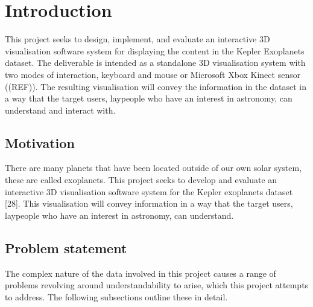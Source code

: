 \chapter{Introduction}\label{C:intro}
This project seeks to design, implement, and evaluate an interactive 3D visualisation software system for displaying the content in the Kepler Exoplanets dataset. The deliverable is intended as a standalone 3D visualisation system with two modes of interaction, keyboard and mouse or Microsoft Xbox Kinect sensor ((REF)). The resulting visualisation will convey the information in the dataset in a way that the target users, laypeople who have an interest in astronomy, can understand and interact with.
\section{Motivation}
There are many planets that have been located outside of our own solar system, these are
called exoplanets. This project seeks to develop and evaluate an interactive 3D visualisation
software system for the Kepler exoplanets dataset [28]. This visualisation will convey information
in a way that the target users, laypeople who have an interest in astronomy, can
understand.
\section{Problem statement}
The complex nature of the data involved in this project causes a range of problems revolving around understandability to arise, which this project attempts to address. The following subsections outline these in detail.
